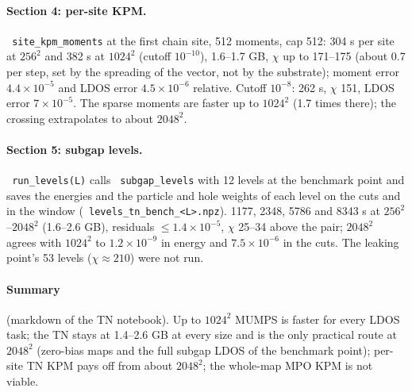 \documentclass[11pt]{article}
\renewcommand{\code}[1]{\texttt{\hyphenchar\font=-1 #1}}
\begin{document}
\paragraph{Section 4: per-site KPM.} \code{site\_kpm\_moments} at the first chain site, 512 moments, cap 512: 304 s per site at $256^2$ and 382 s at
$1024^2$ (cutoff $10^{-10}$), 1.6--1.7 GB, $\chi$ up to 171--175 (about 0.7 per step, set by the spreading of the vector, not by the substrate);
moment error $4.4\times10^{-5}$ and LDOS error $4.5\times10^{-6}$ relative. Cutoff $10^{-8}$: 262 s, $\chi$ 151, LDOS error $7\times10^{-5}$.
The sparse moments are faster up to $1024^2$ (1.7 times there); the crossing extrapolates to about $2048^2$.

\paragraph{Section 5: subgap levels.} \code{run\_levels(L)} calls \code{subgap\_levels} with 12 levels at the benchmark point and saves the energies
and the particle and hole weights of each level on the cuts and in the window (\code{levels\_tn\_bench\_<L>.npz}). 1177, 2348, 5786 and 8343 s at
$256^2$--$2048^2$ (1.6--2.6 GB), residuals $\le1.4\times10^{-5}$, $\chi$ 25--34 above the pair; $2048^2$ agrees with $1024^2$ to $1.2\times10^{-9}$ in energy
and $7.5\times10^{-6}$ in the cuts. The leaking point's 53 levels ($\chi\approx210$) were not run.

\paragraph{Summary} (markdown of the TN notebook). Up to $1024^2$ MUMPS is faster for every LDOS task; the TN stays at 1.4--2.6 GB at every size
and is the only practical route at $2048^2$ (zero-bias maps and the full subgap LDOS of the benchmark point); per-site TN KPM pays off from
about $2048^2$; the whole-map MPO KPM is not viable.
\end{document}
